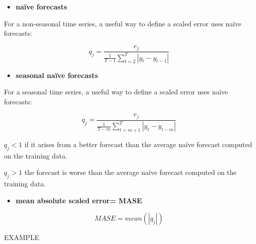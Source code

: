 \documentclass[
]{article}
\providecommand{\tightlist}{%
  \setlength{\itemsep}{0pt}\setlength{\parskip}{0pt}}
\begin{document}
\begin{itemize}
\tightlist
\item
  \textbf{naïve forecasts}
\end{itemize}

For a non-seasonal time series, a useful way to define a scaled error
uses naïve forecasts:

\[q_{j}= \frac{e_j}{\frac{1}{T-1}\sum^T_{t=2}|y_t-y_{t-1}|}\]

\begin{itemize}
\tightlist
\item
  \textbf{seasonal naïve forecasts}
\end{itemize}

For a seasonal time series, a useful way to define a scaled error uses
naïve forecasts:

\[q_{j}= \frac{e_j}{\frac{1}{T-m}\sum^T_{t=m+1}|y_t-y_{t-m}|}\]

\(q_{j}< 1\) if it arises from a better forecast than the average naïve
forecast computed on the training data.

\(q_{j}>1\) the forecast is worse than the average naïve forecast
computed on the training data.

\begin{itemize}
\tightlist
\item
  \textbf{mean absolute scaled error= MASE}
\end{itemize}

\[MASE= mean(|q_{j}|)\]

EXAMPLE
\end{document}
